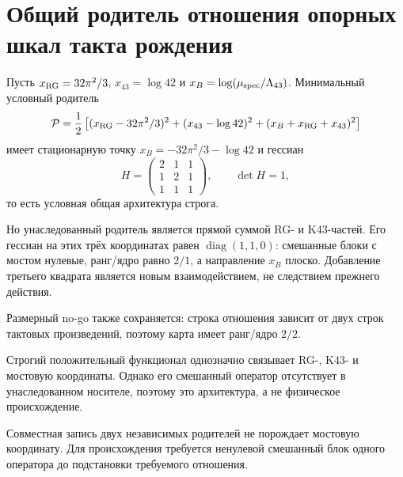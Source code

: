 \chapter{Общий родитель отношения опорных шкал такта рождения}
\label{ch:v10-birth-tick-reference-ratio-common-parent}

Пусть $x_{\rm RG}=32\pi^2/3$, $x_{43}=\log42$ и
$x_B=\log(\mu_{\rm spec}/\Lambda_{43})$. Минимальный условный родитель
\begin{equation}
 \mathcal P=\frac12\left[(x_{\rm RG}-32\pi^2/3)^2+
 (x_{43}-\log42)^2+(x_B+x_{\rm RG}+x_{43})^2\right]
\end{equation}
имеет стационарную точку $x_B=-32\pi^2/3-\log42$ и гессиан
\begin{equation}
 H=\begin{pmatrix}2&1&1\\1&2&1\\1&1&1\end{pmatrix},
 \qquad \det H=1,
\end{equation}
то есть условная общая архитектура строга.

Но унаследованный родитель является прямой суммой RG- и K43-частей. Его
гессиан на этих трёх координатах равен $\operatorname{diag}(1,1,0)$:
смешанные блоки с мостом нулевые, ранг/ядро равно $2/1$, а направление
$x_B$ плоско. Добавление третьего квадрата является новым взаимодействием,
не следствием прежнего действия.

Размерный no-go также сохраняется: строка отношения зависит от двух строк
тактовых произведений, поэтому карта имеет ранг/ядро $2/2$.

\begin{theorem}
Строгий положительный функционал однозначно связывает RG-, K43- и мостовую
координаты. Однако его смешанный оператор отсутствует в унаследованном
носителе, поэтому это архитектура, а не физическое происхождение.
\end{theorem}

\begin{nogocriterion}
Совместная запись двух независимых родителей не порождает мостовую
координату. Для происхождения требуется ненулевой смешанный блок одного
оператора до подстановки требуемого отношения.
\end{nogocriterion}

